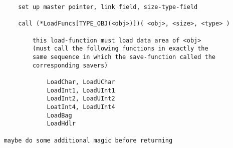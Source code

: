 \documentclass[11pt]{article}
\begin{document}
\begin{small}
\begin{verbatim}
        set up master pointer, link field, size-type-field

        call (*LoadFuncs[TYPE_OBJ(<obj>)])( <obj>, <size>, <type> )

            this load-function must load data area of <obj>
            (must call the following functions in exactly the
            same sequence in which the save-function called the
            corresponding savers)

                LoadChar, LoadUChar
                LoadInt1, LoadUInt1
                LoadInt2, LoadUInt2
                LoatInt4, LoadUInt4
                LoadBag
                LoadHdlr

    maybe do some additional magic before returning
\end{verbatim}
\end{small}
\end{document}
